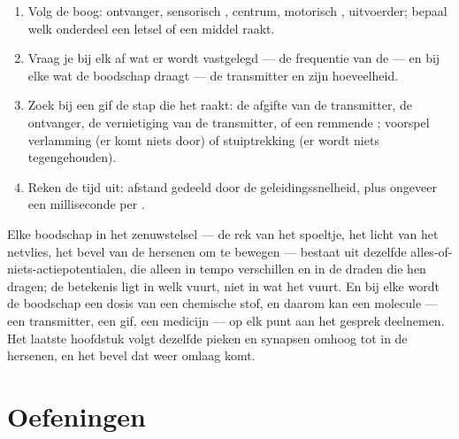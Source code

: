 \begin{method}\label{met:g12:stretch-reflex:analyse}
\begin{enumerate}
  \item Volg de boog: ontvanger, sensorisch , centrum, motorisch
        , uitvoerder; bepaal welk onderdeel een letsel of een middel
        raakt.
  \item Vraag je bij elk  af wat er wordt vastgelegd --- de
        frequentie van de  --- en bij elke  wat de
        boodschap draagt --- de transmitter en zijn hoeveelheid.
  \item Zoek bij een gif de stap die het raakt: de afgifte van de
        transmitter, de ontvanger, de vernietiging van de transmitter, of
        een remmende ; voorspel verlamming (er komt niets door) of
        stuiptrekking (er wordt niets tegengehouden).
  \item Reken de tijd uit: afstand gedeeld door de geleidingssnelheid,
        plus ongeveer een milliseconde per .
\end{enumerate}
\end{method}

\begin{remark}\label{rem:g12:stretch-reflex:spikes}
Elke boodschap in het zenuwstelsel --- de rek van het spoeltje, het licht
van het netvlies, het bevel van de hersenen om te bewegen --- bestaat uit
dezelfde alles-of-niets-actiepotentialen, die alleen in tempo verschillen
en in de draden die hen dragen; de betekenis ligt in welk  vuurt,
niet in wat het vuurt. En bij elke  wordt de boodschap een dosis van
een chemische stof, en daarom kan een molecule --- een transmitter, een
gif, een medicijn --- op elk punt aan het gesprek deelnemen. Het laatste
hoofdstuk volgt dezelfde pieken en synapsen omhoog tot in de hersenen, en
het bevel dat weer omlaag komt.
\end{remark}

\section{Oefeningen}


